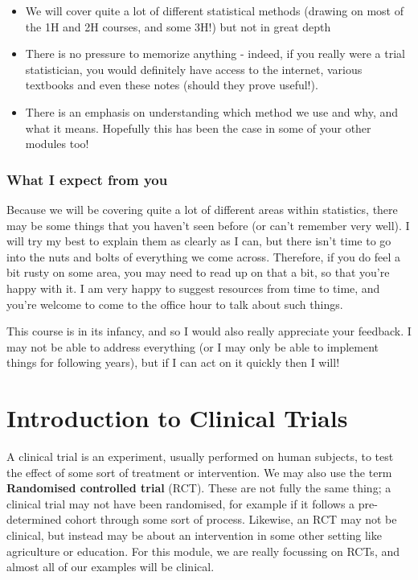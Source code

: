 \documentclass[
  openany]{book}
\providecommand{\tightlist}{%
  \setlength{\itemsep}{0pt}\setlength{\parskip}{0pt}}
\theoremstyle{definition}
\theoremstyle{definition}
\theoremstyle{definition}
\theoremstyle{definition}
\theoremstyle{remark}
\begin{document}
\begin{itemize}
\tightlist
\item
  We will cover quite a lot of different statistical methods (drawing on most of the 1H and 2H courses, and some 3H!) but not in great depth
\item
  There is no pressure to memorize anything - indeed, if you really were a trial statistician, you would definitely have access to the internet, various textbooks and even these notes (should they prove useful!).
\item
  There is an emphasis on understanding which method we use and why, and what it means. Hopefully this has been the case in some of your other modules too!
\end{itemize}

\subsection*{What I expect from you}\label{what-i-expect-from-you}

Because we will be covering quite a lot of different areas within statistics, there may be some things that you haven't seen before (or can't remember very well). I will try my best to explain them as clearly as I can, but there isn't time to go into the nuts and bolts of everything we come across. Therefore, if you do feel a bit rusty on some area, you may need to read up on that a bit, so that you're happy with it. I am very happy to suggest resources from time to time, and you're welcome to come to the office hour to talk about such things.

This course is in its infancy, and so I would also really appreciate your feedback. I may not be able to address everything (or I may only be able to implement things for following years), but if I can act on it quickly then I will!

\chapter{Introduction to Clinical Trials}\label{rct-intro}

A clinical trial is an experiment, usually performed on human subjects, to test the effect of some sort of treatment or intervention. We may also use the term \textbf{Randomised controlled trial} (RCT). These are not fully the same thing; a clinical trial may not have been randomised, for example if it follows a pre-determined cohort through some sort of process. Likewise, an RCT may not be clinical, but instead may be about an intervention in some other setting like agriculture or education. For this module, we are really focussing on RCTs, and almost all of our examples will be clinical.
\end{document}
